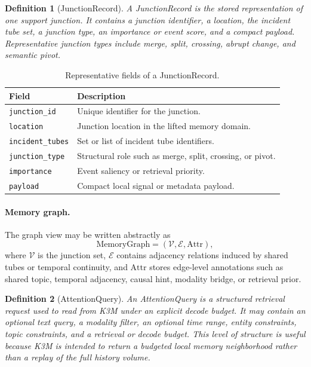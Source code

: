 \documentclass[11pt]{article}
\newtheorem{definition}{Definition}
\begin{document}
\begin{definition}[JunctionRecord]
A \emph{JunctionRecord} is the stored representation of one support junction. It contains a junction identifier, a location, the incident tube set, a junction type, an importance or event score, and a compact payload. Representative junction types include merge, split, crossing, abrupt change, and semantic pivot.
\end{definition}

\begin{table}[h]
\centering
\caption{Representative fields of a JunctionRecord.}
\label{tab:junctionrecord-fields}
\begin{tabular}{>{\raggedright\arraybackslash}p{} >{\raggedright\arraybackslash}p{}}
\toprule
Field & Description \\
\midrule
\texttt{junction\_id} & Unique identifier for the junction. \\
\texttt{location} & Junction location in the lifted memory domain. \\
\texttt{incident\_tubes} & Set or list of incident tube identifiers. \\
\texttt{junction\_type} & Structural role such as merge, split, crossing, or pivot. \\
\texttt{importance} & Event saliency or retrieval priority. \\
\texttt{payload} & Compact local signal or metadata payload. \\
\bottomrule
\end{tabular}
\end{table}

\paragraph{Memory graph.}
The graph view may be written abstractly as
\begin{equation}
\mathrm{MemoryGraph} = (\mathcal{V},\mathcal{E},\mathrm{Attr}),
\end{equation}
where $\mathcal{V}$ is the junction set, $\mathcal{E}$ contains adjacency relations induced by shared tubes or temporal continuity, and $\mathrm{Attr}$ stores edge-level annotations such as shared topic, temporal adjacency, causal hint, modality bridge, or retrieval prior.

\begin{definition}[AttentionQuery]
An \emph{AttentionQuery} is a structured retrieval request used to read from K3M under an explicit decode budget. It may contain an optional text query, a modality filter, an optional time range, entity constraints, topic constraints, and a retrieval or decode budget. This level of structure is useful because K3M is intended to return a budgeted local memory neighborhood rather than a replay of the full history volume.
\end{definition}
\end{document}
